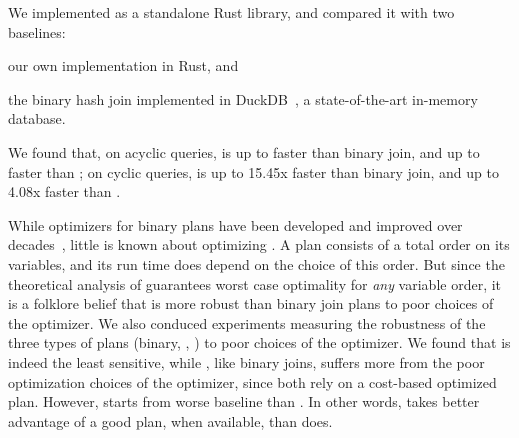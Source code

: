 We implemented \FJ as a standalone Rust library, and
compared it with two baselines:
  \begin{enumerate*}
    \item our own \GJ implementation in Rust, and
    \item the binary hash join implemented in
      DuckDB~\cite{DBLP:conf/cidr/RaasveldtM20,DBLP:conf/vldb/Raasveldt22},
      a state-of-the-art in-memory database.
    \end{enumerate*}
  We found that, on acyclic queries, \FJ is up to \imdbmaxfjbj
  faster than binary join, and up to \imdbmaxfjgj faster than \GJ; on
  cyclic queries, \FJ is up to 15.45x faster than binary join, and up
  to 4.08x faster than \GJ.

  While optimizers for binary plans have been developed and improved
  over decades~\cite{DBLP:conf/sigmod/SelingerACLP79}, little
  is known about optimizing \GJ.  A \GJ plan consists of a total order
  on its variables, and its run time does depend on the choice of this
  order.  But since the theoretical analysis of \GJ guarantees worst
  case optimality for {\em any} variable order, it is a folklore
  belief that \GJ is more robust than binary join plans to poor
  choices of the optimizer.  We also conduced experiments measuring
  the robustness of the three types of plans (binary, \GJ, \FJ) to
  poor choices of the optimizer.  We found that \GJ is indeed the
  least sensitive, while \FJ, like binary joins, suffers more from the
  poor optimization choices of the optimizer, since both rely on a
  cost-based optimized plan.  However, \GJ starts from worse baseline
  than \FJ.  In other words, \FJ takes better advantage of a good
  plan, when available, than \GJ does.


